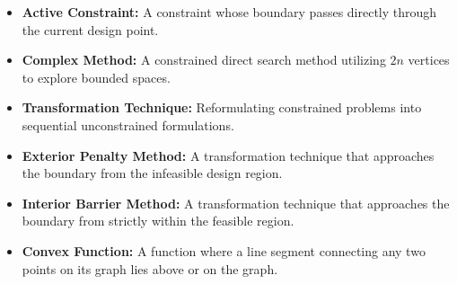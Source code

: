 \documentclass[12pt,a4paper]{article}
\begin{document}
\begin{tcolorbox}[defbox, title={\textbf{One-Line Definitions}}]
\begin{itemize}[leftmargin=*, itemsep=2.5pt, topsep=0pt]
  \item \textbf{Active Constraint:} A constraint whose boundary passes directly through the current design point.
  \item \textbf{Complex Method:} A constrained direct search method utilizing $2n$ vertices to explore bounded spaces.
  \item \textbf{Transformation Technique:} Reformulating constrained problems into sequential unconstrained formulations.
  \item \textbf{Exterior Penalty Method:} A transformation technique that approaches the boundary from the infeasible design region.
  \item \textbf{Interior Barrier Method:} A transformation technique that approaches the boundary from strictly within the feasible region.
  \item \textbf{Convex Function:} A function where a line segment connecting any two points on its graph lies above or on the graph.
\end{itemize}
\end{tcolorbox}
\end{document}
